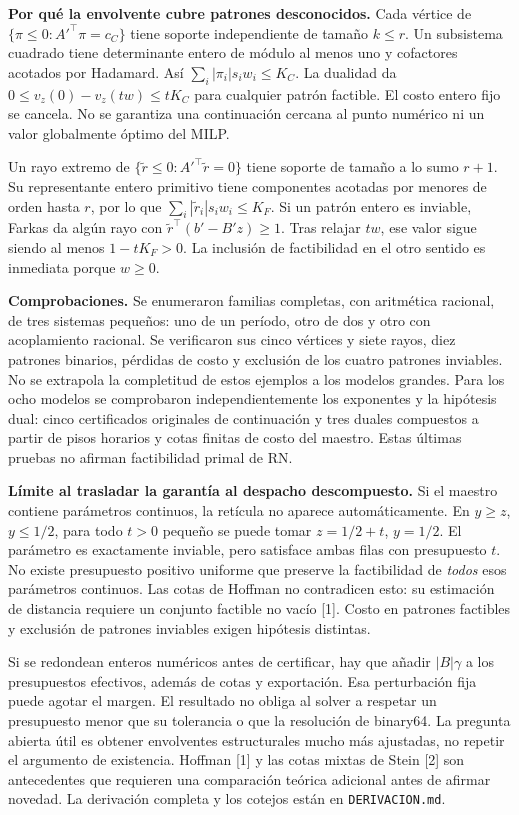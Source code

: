 \documentclass[10pt,a4paper]{article}
\begin{document}
\newpage
\textbf{Por qué la envolvente cubre patrones desconocidos.}
Cada vértice de $\{\pi\le0:A'^\top\pi=c_C\}$ tiene soporte independiente de tamaño
$k\le r$. Un subsistema cuadrado tiene determinante entero de módulo al menos
uno y cofactores acotados por Hadamard. Así $\sum_i|\pi_i|s_iw_i\le K_C$.
La dualidad da $0\le v_z(0)-v_z(tw)\le tK_C$ para cualquier patrón factible.
El costo entero fijo se cancela. No se garantiza una continuación cercana al
punto numérico ni un valor globalmente óptimo del MILP.

Un rayo extremo de $\{\widetilde r\le0:A'^\top\widetilde r=0\}$ tiene soporte
de tamaño a lo sumo $r+1$. Su representante entero primitivo tiene componentes
acotadas por menores de orden hasta $r$, por lo que
$\sum_i|\widetilde r_i|s_iw_i\le K_F$. Si un patrón entero es inviable,
Farkas da algún rayo con $\widetilde r^\top(b'-B'z)\ge1$.
Tras relajar $tw$, ese valor sigue siendo al menos $1-tK_F>0$.
La inclusión de factibilidad en el otro sentido es inmediata porque $w\ge0$.

\textbf{Comprobaciones.} Se enumeraron familias completas, con aritmética
racional, de tres sistemas pequeños: uno de un período, otro de dos y otro con
acoplamiento racional. Se verificaron sus cinco vértices y siete rayos,
diez patrones binarios, pérdidas de costo y exclusión de los cuatro patrones
inviables. No se extrapola la completitud de estos ejemplos a los modelos grandes.
Para los ocho modelos se comprobaron independientemente los exponentes y la
hipótesis dual: cinco certificados originales de continuación y tres duales
compuestos a partir de pisos horarios y cotas finitas de costo del maestro.
Estas últimas pruebas no afirman factibilidad primal de RN.

\textbf{Límite al trasladar la garantía al despacho descompuesto.}
Si el maestro contiene parámetros continuos, la retícula no aparece automáticamente.
En $y\ge z$, $y\le1/2$, para todo $t>0$ pequeño se puede tomar
$z=1/2+t$, $y=1/2$. El parámetro es exactamente inviable, pero satisface ambas
filas con presupuesto $t$. No existe presupuesto positivo uniforme que preserve
la factibilidad de \emph{todos} esos parámetros continuos.
Las cotas de Hoffman no contradicen esto: su estimación de distancia requiere
un conjunto factible no vacío [1]. Costo en patrones factibles y exclusión de
patrones inviables exigen hipótesis distintas.

Si se redondean enteros numéricos antes de certificar, hay que añadir $|B|\gamma$
a los presupuestos efectivos, además de cotas y exportación. Esa perturbación
fija puede agotar el margen. El resultado no obliga al solver a respetar un
presupuesto menor que su tolerancia o que la resolución de binary64.
La pregunta abierta útil es obtener envolventes estructurales mucho más ajustadas,
no repetir el argumento de existencia. Hoffman [1] y las cotas mixtas de Stein [2]
son antecedentes que requieren una comparación teórica adicional antes de afirmar
novedad. La derivación completa y los cotejos están en \texttt{DERIVACION.md}.
\end{document}
